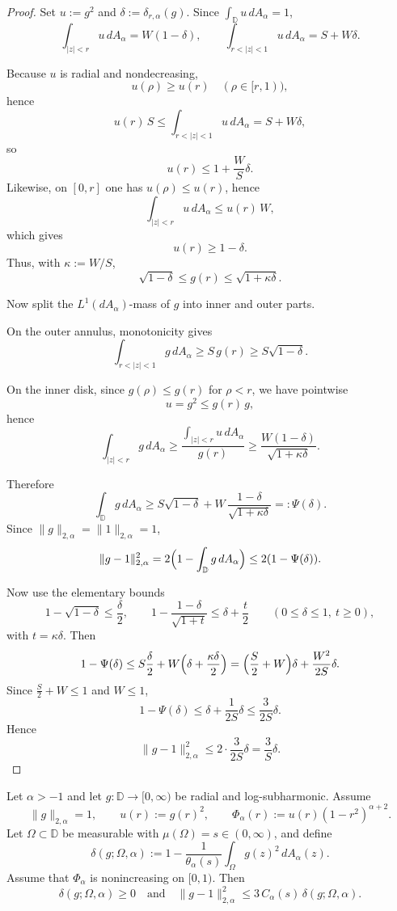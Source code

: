\documentclass[a4paper,10pt]{amsart}
\newcommand{\D}{\mathbb{D}}
\begin{document}
\begin{proof}
Set $u:=g^2$ and $\delta:=\delta_{r,\alpha}(g)$. Since $\int_{\D}u\,dA_\alpha=1$,
\[
\int_{|z|<r}u\,dA_\alpha=W(1-\delta),
\qquad
\int_{r<|z|<1}u\,dA_\alpha=S+W\delta.
\]

Because $u$ is radial and nondecreasing,
\[
u(\rho)\ge u(r)\quad (\rho\in[r,1)),
\]
hence
\[
u(r)\,S\le \int_{r<|z|<1}u\,dA_\alpha=S+W\delta,
\]
so
\[
u(r)\le 1+\frac{W}{S}\delta.
\]
Likewise, on $[0,r]$ one has $u(\rho)\le u(r)$, hence
\[
\int_{|z|<r}u\,dA_\alpha\le u(r)\,W,
\]
which gives
\[
u(r)\ge 1-\delta.
\]
Thus, with $\kappa:=W/S$,
\[
\sqrt{1-\delta}\le g(r)\le \sqrt{1+\kappa\delta}.
\]

Now split the $L^1(dA_\alpha)$-mass of $g$ into inner and outer parts.

On the outer annulus, monotonicity gives
\[
\int_{r<|z|<1} g\,dA_\alpha \ge S\,g(r)\ge S\sqrt{1-\delta}.
\]

On the inner disk, since $g(\rho)\le g(r)$ for $\rho<r$, we have pointwise
\[
u=g^2\le g(r)\,g,
\]
hence
\[
\int_{|z|<r} g\,dA_\alpha
\ge \frac{\int_{|z|<r}u\,dA_\alpha}{g(r)}
\ge \frac{W(1-\delta)}{\sqrt{1+\kappa\delta}}.
\]

Therefore
\[
\int_{\D} g\,dA_\alpha
\ge
S\sqrt{1-\delta}
+
W\,\frac{1-\delta}{\sqrt{1+\kappa\delta}}
=: \Psi(\delta).
\]
Since $\|g\|_{2,\alpha}=\|1\|_{2,\alpha}=1$,
\[
\|g-1\|_{2,\alpha}^2
=2\Bigl(1-\int_\D g\,dA_\alpha\Bigr)
\le 2(1-\Psi(\delta)).
\]

Now use the elementary bounds
\[
1-\sqrt{1-\delta}\le \frac{\delta}{2},
\qquad
1-\frac{1-\delta}{\sqrt{1+t}}\le \delta+\frac{t}{2}
\qquad (0\le\delta\le 1,\ t\ge0),
\]
with $t=\kappa\delta$. Then
\[
1-\Psi(\delta)
\le
S\frac{\delta}{2}
+
W\Bigl(\delta+\frac{\kappa\delta}{2}\Bigr)
=
\Bigl(\frac S2+W\Bigr)\delta+\frac{W^2}{2S}\delta.
\]
Since $\frac S2+W\le 1$ and $W\le 1$,
\[
1-\Psi(\delta)\le \delta+\frac{1}{2S}\delta\le \frac{3}{2S}\delta.
\]
Hence
\[
\|g-1\|_{2,\alpha}^2\le 2\cdot \frac{3}{2S}\delta=\frac{3}{S}\delta.
\]
\end{proof}


\begin{numprop}
\label{prop:bathtub_monotone}
Let $\alpha>-1$ and let $g:\D\to[0,\infty)$ be radial and log-subharmonic.
Assume
\[
\|g\|_{2,\alpha}=1,
\qquad
u(r):=g(r)^2,
\qquad
\Phi_\alpha(r):=u(r)(1-r^2)^{\alpha+2}.
\]
Let $\Omega\subset\D$ be measurable with $\mu(\Omega)=s\in(0,\infty)$, and define
\[
\delta(g;\Omega,\alpha)
:=1-\frac{1}{\theta_\alpha(s)}\int_\Omega g(z)^2\,dA_\alpha(z).
\]
Assume that $\Phi_\alpha$ is nonincreasing on $[0,1)$.
Then
\[
\delta(g;\Omega,\alpha)\ge 0
\quad\text{and}\quad
\|g-1\|_{2,\alpha}^2
\le 3\,C_\alpha(s)\,\delta(g;\Omega,\alpha).
\]
\end{numprop}
\end{document}
